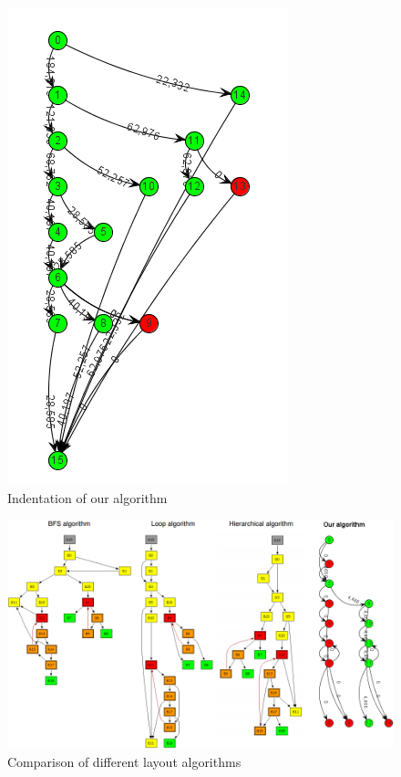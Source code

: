 \documentclass[conference,10pt,twocolumn]{./IEEE/IEEEtran}
\begin{document}
\begin{figure}[t]
\center
  \includegraphics[scale=0.5]{layout_demo2.png}
  \caption{Indentation of our algorithm}
  \label{eg1}
\end{figure}

\begin{figure}[t]
\center
  \includegraphics[scale=0.33]{layout_demo.png}
  \caption{Comparison of different layout algorithms}
  \label{dm1}
\end{figure}
\end{document}
